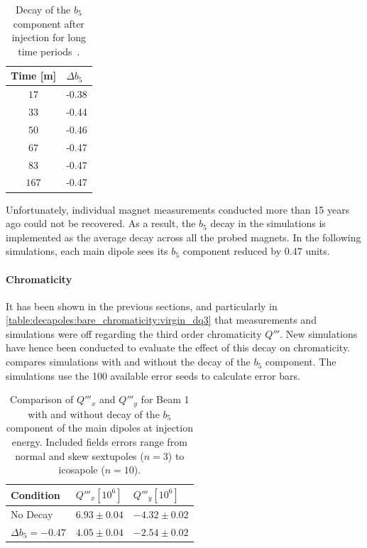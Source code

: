 \begin{table}[!htb]
    \centering
    \begin{tabular}{cl}
        \toprule
        Time [m] & $\Delta b_5$ \\
        \midrule
        $17$    & -0.38 \\ 
        $33$    & -0.44 \\
        $50$    & -0.46 \\
        $67$    & -0.47 \\
        $83$    & -0.47 \\
        $167$   & -0.47 \\
        \bottomrule
    \end{tabular}
    \caption{Decay of the $b_5$ component after injection for long time
    periods~\cite{deniau_magnetic_2009}.}
    \label{table:decapoles:decay:decay_b5}
\end{table}
 
Unfortunately, individual magnet measurements conducted more than 15 years ago could not be recovered. As
a result, the $b_5$ decay in the simulations is implemented as the average decay across all the
probed magnets. In the following simulations, each main dipole sees its $b_5$ component reduced by
$0.47$ units.


\paragraph{Chromaticity}

It has been shown in the previous sections, and particularly in
\cref{table:decapoles:bare_chromaticity:virgin_dq3} that measurements and simulations were off
regarding the third order chromaticity $Q'''$.
New simulations have hence been conducted to evaluate the effect of this decay on chromaticity.
 compares simulations with and
without the decay of the $b_5$ component. The simulations use the 100 available error seeds to
calculate error bars.

\begin{table}[!htb]
    \centering
    \begin{tabular}{lll}
      \toprule
      Condition            & $Q'''_x [10^6]$ & $Q'''_y [10^6]$ \\
      \midrule
      No Decay             & $6.93 \pm 0.04$ & $-4.32 \pm 0.02$ \\
      $\Delta b_5 = -0.47$ & $4.05 \pm 0.04$ & $-2.54 \pm 0.02 $ \\
      \bottomrule
    \end{tabular}
    \caption{Comparison of $Q'''_x$ and $Q'''_y$ for Beam 1 with and without decay of the $b_5$
    component of the main dipoles at injection energy. Included fields errors range from normal and
    skew sextupoles ($n=3$) to icosapole ($n=10$).}
    \label{table:decapoles:decay:simulation_chromaticity}
  \end{table}

